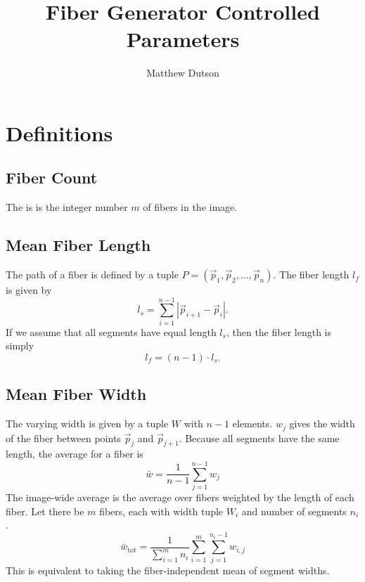 \documentclass[12pt]{article}
\title{Fiber Generator Controlled Parameters}
\author{Matthew Dutson}
\begin{document}
\maketitle
\thispagestyle{empty}
\pagestyle{empty}

    
\section*{Definitions}


\subsection*{Fiber Count}

The is is the integer number $m$ of fibers in the image.


\subsection*{Mean Fiber Length}

The path of a fiber is defined by a tuple $P = (\vec{p}_1, \vec{p}_2, \ldots, \vec{p}_n)$. The fiber length $l_f$ is given by
\begin{equation*}
    l_s = \sum_{i = 1}^{n - 1} |\vec{p}_{i + 1} - \vec{p}_i|.
\end{equation*}
If we assume that all segments have equal length $l_s$, then the fiber length is simply
\begin{equation*}
    l_f = (n - 1) \cdot l_s.
\end{equation*}


\subsection*{Mean Fiber Width}

The varying width is given by a tuple $W$ with $n - 1$ elements. $w_j$ gives the width of the fiber between points $\vec{p}_j$ and $\vec{p}_{j + 1}$. Because all segments have the same length, the average for a fiber is
\begin{equation*}
    \bar{w} = \frac{1}{n - 1} \sum_{j = 1}^{n - 1} w_j
\end{equation*}
The image-wide average is the average over fibers weighted by the length of each fiber. Let there be $m$ fibers, each with width tuple $W_i$ and number of segments $n_i$.
\begin{equation*}
    \bar{w}_\text{tot} = 
        \frac{1}{\sum_{i = 1}^m n_i} 
        \sum_{i = 1}^m \sum_{j = 1}^{n_i - 1} w_{i,j}
\end{equation*}
This is equivalent to taking the fiber-independent mean of segment widths.
\end{document}
